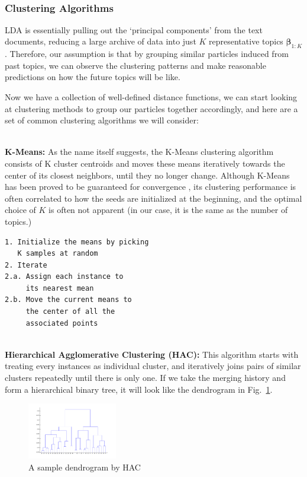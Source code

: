 \documentclass[conference]{IEEEtran}
\begin{document}
\-\\

\subsubsection{Clustering Algorithms}
LDA is essentially pulling out the `principal components' from the text documents, reducing a large archive of data into just $K$ representative topics $\mathbf{\beta}_{1:K}$. Therefore, our assumption is that by grouping similar particles induced from past topics, we can observe the clustering patterns and make reasonable predictions on how the future topics will be like.

Now we have a collection of well-defined distance functions, we can start looking at clustering methods to group our particles together accordingly, and here are a set of common clustering algorithms we will consider:

\-\\
\textbf{K-Means:} As the name itself suggests, the K-Means clustering algorithm consists of K cluster centroids and moves these means iteratively towards the center of its closest neighbors, until they no longer change. Although K-Means has been proved to be guaranteed for convergence \cite{selim1984}, its clustering performance is often correlated to how the seeds are initialized at the beginning, and the optimal choice of $K$ is often not apparent (in our case, it is the same as the number of topics.)

\begin{verbatim}
1. Initialize the means by picking 
   K samples at random
2. Iterate
2.a. Assign each instance to 
     its nearest mean
2.b. Move the current means to 
	 the center of all the 
	 associated points
\end{verbatim}
\-\\
\textbf{Hierarchical Agglomerative Clustering (HAC):} This algorithm starts with treating every instances as individual cluster, and iteratively joins pairs of similar clusters repeatedly until there is only one. If we take the merging history and form a hierarchical binary tree, it will look like the dendrogram in Fig.~\ref{dendrogram}.

\begin{figure}[h]
	\center	
	\includegraphics[width=0.35\textwidth]{fig/dendrogram.png}
	\caption{A sample dendrogram by HAC}
	\label{dendrogram}
\end{figure}
\end{document}
